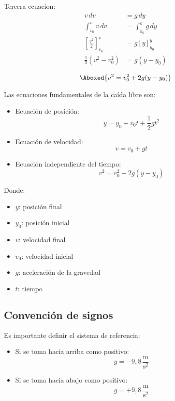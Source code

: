 Tercera ecuacion:
\begin{align*}
v\,dv &= g\,dy \\
\int_{v_0}^{v} v\,dv &= \int_{y_0}^{y} g\,dy \\
\left[\frac{v^2}{2}\right]_{v_0}^{v} &= g\left[y\right]_{y_0}^{y} \\
\frac{1}{2}(v^2 - v_0^2) &= g(y - y_0)
\end{align*}

\vspace{-30pt}

\begin{align*}
    \Aboxed{v^2 = v_0^2 + 2g(y - y_0)}
\end{align*}

Las ecuaciones fundamentales de la caída libre son:

\begin{itemize}
    \item Ecuación de posición:
    \[
    y = y_0 + v_0 t + \frac{1}{2}gt^2
    \]

    \item Ecuación de velocidad:
    \[
    v = v_0 + gt
    \]

    \item Ecuación independiente del tiempo:
    \[
    v^2 = v_0^2 + 2g(y - y_0)
    \]
\end{itemize}

Donde:
\begin{itemize}
    \setlength{\itemsep}{0pt}
    \item $y$: posición final
    \item $y_0$: posición inicial
    \item $v$: velocidad final
    \item $v_0$: velocidad inicial
    \item $g$: aceleración de la gravedad
    \item $t$: tiempo
\end{itemize}

\subsection{Convención de signos}

Es importante definir el sistema de referencia:

\begin{itemize}
    \setlength{\itemsep}{0pt}
    \item Si se toma hacia arriba como positivo:
    \[
    g = -9{,}8\,\frac{\text{m}}{\text{s}^2}
    \]
    \item Si se toma hacia abajo como positivo:
    \[
    g = +9{,}8\,\frac{\text{m}}{\text{s}^2}
    \]
\end{itemize}

